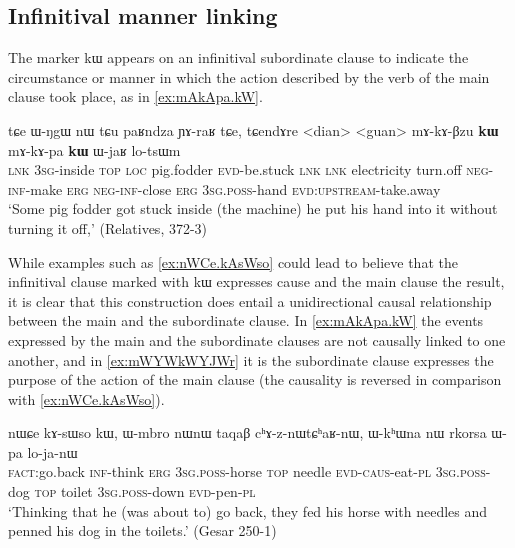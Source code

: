\documentclass[oldfontcommands,oneside,a4paper,11pt]{article}
\newcommand{\ipa}[1]{{\phon #1}} %
\begin{document}
 \subsection{Infinitival manner linking} \label{sec:manner}
The marker \ipa{kɯ}  appears on an infinitival subordinate clause  to indicate the circumstance or manner in which the action described by the verb of the main clause took place, as in \ref{ex:mAkApa.kW}. 

\begin{exe}
\ex \label{ex:mAkApa.kW}
\gll
\ipa{tɕe}   	\ipa{ɯ-ŋgɯ}   	\ipa{nɯ} \ipa{tɕu}   	\ipa{paʁndza}   	\ipa{ɲɤ-raʁ}   	\ipa{tɕe,}   	\ipa{tɕendɤre}   	<dian>   	<guan>   	\ipa{mɤ-kɤ-βzu} 	\ipa{\textbf{kɯ}}   	\ipa{mɤ-kɤ-pa}   	\ipa{\textbf{kɯ}}   	\ipa{ɯ-jaʁ}   	\ipa{lo-tsɯm}   \\
\textsc{lnk} \textsc{3sg}-inside \textsc{top} \textsc{loc} pig.fodder \textsc{evd}-be.stuck \textsc{lnk}
\textsc{lnk} electricity turn.off \textsc{neg-inf}-make \textsc{erg}  \textsc{neg-inf}-close \textsc{erg}  \textsc{3sg.poss}-hand \textsc{evd:upstream}-take.away \\
\glt `Some pig fodder got stuck inside (the machine) he put his hand into it without turning it off,' (Relatives, 372-3)
\end{exe} 

 While  examples such as \ref{ex:nWCe.kAsWso} could lead to believe that the infinitival clause marked with \ipa{kɯ}  expresses  cause and the main clause the result, it is clear that this construction does entail a unidirectional causal relationship between the main and the subordinate clause. In \ref{ex:mAkApa.kW} the events expressed by the main and the subordinate clauses are not causally linked to one another, and in  \ref{ex:mWYWkWYJWr} it is the subordinate clause expresses the purpose of the action of the main clause (the causality is reversed in comparison with \ref{ex:nWCe.kAsWso}).

  \begin{exe}
\ex \label{ex:nWCe.kAsWso}
\gll 
\ipa{nɯɕe}  	\ipa{kɤ-sɯso}  	\ipa{kɯ,}  	\ipa{ɯ-mbro}  	\ipa{nɯnɯ}  	\ipa{taqaβ}  	\ipa{cʰɤ-z-nɯtɕʰaʁ-nɯ,}  	\ipa{ɯ-kʰɯna}  	\ipa{nɯ}  	\ipa{rkorsa}  	\ipa{ɯ-pa}  	\ipa{lo-ja-nɯ}  \\
\textsc{fact}:go.back \textsc{inf}-think \textsc{erg} \textsc{3sg.poss}-horse \textsc{top} needle \textsc{evd-caus}-eat-\textsc{pl}   \textsc{3sg.poss}-dog \textsc{top} toilet \textsc{3sg.poss}-down \textsc{evd}-pen-\textsc{pl} \\
\glt `Thinking that he (was about to) go back, they fed his horse with needles and penned his dog in the toilets.' (Gesar 250-1)
 \end{exe} 
 
\end{document}
